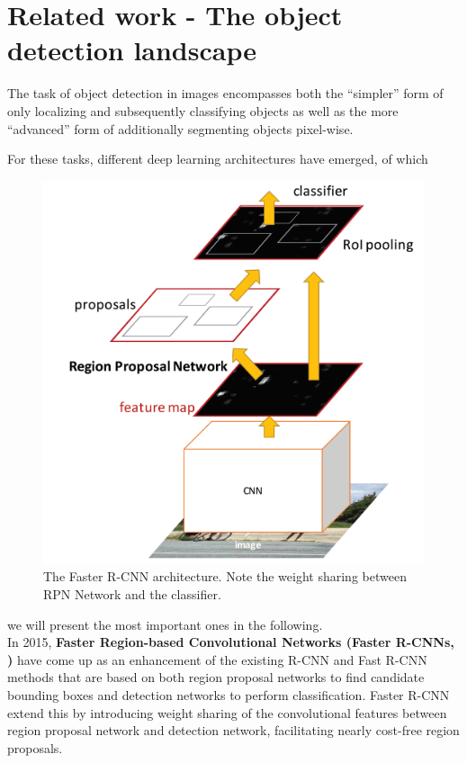 \documentclass[a4paper]{article}
\begin{document}
\section{Related work - The object detection landscape}
The task of object detection in images encompasses both the ``simpler'' form of only localizing and subsequently classifying objects as well as the more ``advanced'' form of additionally segmenting objects pixel-wise. 

For these tasks, different deep learning architectures have emerged, of which \begin{figure}
\includegraphics[scale=0.38]{images/FRCN_architecture}
\caption{The Faster R-CNN architecture. Note the weight sharing between RPN Network and the classifier.}
\end{figure} we will present the most important ones in the following.\\ In 2015, \textbf{Faster Region-based Convolutional Networks (Faster R-CNNs, \cite{DBLP:journals/corr/RenHG015})} have come up as an enhancement  of the existing R-CNN and Fast R-CNN methods that are based on both region proposal networks to find candidate bounding boxes and detection networks to perform classification. Faster R-CNN extend this by introducing weight sharing of the convolutional features between region proposal network and detection network, facilitating nearly cost-free region proposals. 
\end{document}
